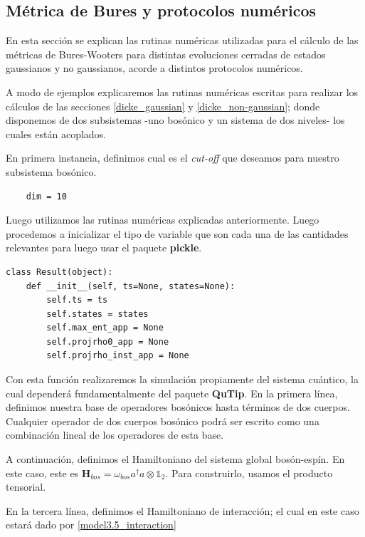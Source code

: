 \documentclass{report} %
\numberwithin{equation}{section}
\begin{document}
\subsection{M\'etrica de Bures y protocolos num\'ericos}

En esta sección se explican las rutinas numéricas utilizadas para el cálculo de las métricas de Bures-Wooters para distintas evoluciones cerradas de estados gaussianos y no gaussianos, acorde a distintos protocolos numéricos. 

A modo de ejemplos explicaremos las rutinas numéricas escritas para realizar los cálculos de las secciones \ref{dicke_gaussian} y \ref{dicke_non-gaussian}; donde disponemos de dos subsistemas -uno bosónico y un sistema de dos niveles- los cuales están acoplados. 

En primera instancia, definimos cual es el \textit{cut-off} que deseamos para nuestro subsistema bosónico. 

\begin{verbatim}
    dim = 10
\end{verbatim}

Luego utilizamos las rutinas numéricas explicadas anteriormente. Luego procedemos a inicializar el tipo de variable que son cada una de las cantidades relevantes para luego usar el paquete \textbf{pickle}. 


\begin{verbatim}
class Result(object):
    def __init__(self, ts=None, states=None):
        self.ts = ts
        self.states = states
        self.max_ent_app = None
        self.projrho0_app = None
        self.projrho_inst_app = None 
\end{verbatim}

Con esta función realizaremos la simulación propiamente del sistema cuántico, la cual dependerá fundamentalmente del paquete \textbf{QuTip}. En la primera línea, definimos nuestra base de operadores bosónicos hasta términos de dos cuerpos. Cualquier operador de dos cuerpos bosónico podrá ser escrito como una combinación lineal de los operadores de esta base.

A continuación, definimos el Hamiltoniano del sistema global bosón-espín. En este caso, este es $\mathbf{H}_{bos} = \omega_{bos} a^{\dagger}a \otimes \mathds{1}_2$. Para construirlo, usamos el producto tensorial. 

En la tercera línea, definimos el Hamiltoniano de interacción; el cual en este caso estará dado por \eqref{model3.5_interaction}
\end{document}
